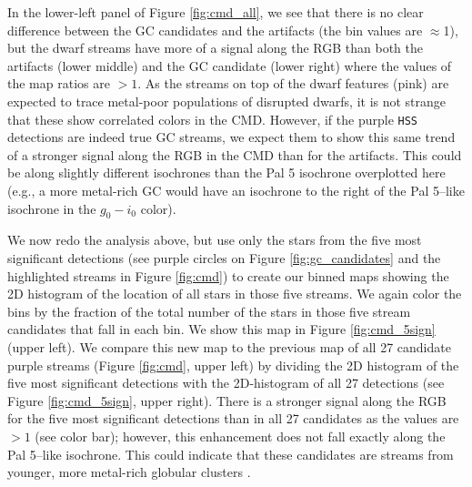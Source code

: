 \documentclass[twocolumn]{aastex631}
\begin{document}
In the lower-left panel of Figure \ref{fig:cmd_all}, we see that there is no clear difference between the GC candidates and the artifacts (the bin values are $\approx$1), but the dwarf streams have more of a signal along the RGB than both the artifacts (lower middle) and the GC candidate (lower right) where the values of the map ratios are $>1$. As the streams on top of the dwarf features (pink) are expected to trace metal-poor populations of disrupted dwarfs, it is not strange that these show correlated colors in the CMD. However, if the purple \texttt{HSS} detections are indeed true GC streams, we expect them to show this same trend of a stronger signal along the RGB in the CMD than for the artifacts. This could be along slightly different isochrones than the Pal 5 isochrone overplotted here (e.g., a more metal-rich GC would have an isochrone to the right of the Pal 5--like isochrone in the $g_0-i_0$ color).

We now redo the analysis above, but use only the stars from the five most significant detections  (see purple circles on Figure \ref{fig:gc_candidates} and the highlighted streams in Figure \ref{fig:cmd}) to create our binned maps showing the 2D histogram of the location of all stars in those five streams. We again color the bins by the fraction of the total number of the stars in those five stream candidates that fall in each bin. We show this map in Figure \ref{fig:cmd_5sign} (upper left). We compare this new map to the previous map of all 27 candidate purple streams (Figure \ref{fig:cmd}, upper left) by dividing the 2D histogram of the five most significant detections with the  2D-histogram of all 27 detections (see Figure \ref{fig:cmd_5sign}, upper right). There is a stronger signal along the RGB for the five most significant detections than in all 27 candidates as the values are $>1$ (see color bar); however, this enhancement does not fall exactly along the Pal 5--like isochrone. This could indicate that these candidates are streams from younger, more metal-rich globular clusters \citep[see GC metallicity distributions for M31 in, e.g.,][]{barmby00,caldwell16}.
\end{document}
